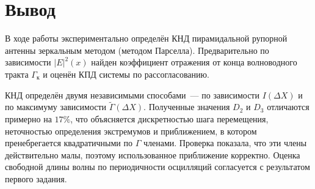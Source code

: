 \section{Вывод}

В ходе работы экспериментально определён КНД пирамидальной рупорной антенны зеркальным методом (методом Парселла). Предварительно по зависимости $|E|^2(x)$ найден коэффициент отражения от конца волноводного тракта $\Gamma_{\text{к}}$ и оценён КПД системы по рассогласованию.

КНД определён двумя независимыми способами~--- по зависимости $I(\Delta X)$ и по максимуму зависимости $\widetilde{\Gamma}(\Delta X)$. Полученные значения $D_2$ и $D_3$ отличаются примерно на $17\%$, что объясняется дискретностью шага перемещения, неточностью определения экстремумов и приближением, в котором пренебрегается квадратичными по $\Gamma$ членами. Проверка показала, что эти члены действительно малы, поэтому использованное приближение корректно. Оценка свободной длины волны по периодичности осцилляций согласуется с результатом первого задания.